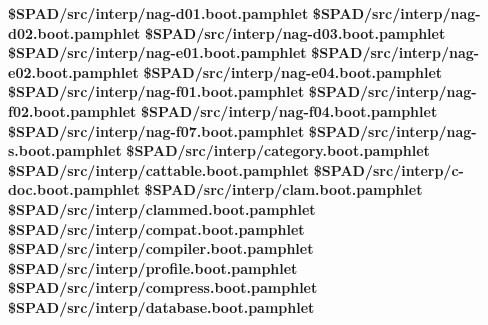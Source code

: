 \documentclass{article}
\begin{document}
\begin{thebibliography}{99}
 {\bf \$SPAD/src/interp/nag-d01.boot.pamphlet}
 {\bf \$SPAD/src/interp/nag-d02.boot.pamphlet}
 {\bf \$SPAD/src/interp/nag-d03.boot.pamphlet}
 {\bf \$SPAD/src/interp/nag-e01.boot.pamphlet}
 {\bf \$SPAD/src/interp/nag-e02.boot.pamphlet}
 {\bf \$SPAD/src/interp/nag-e04.boot.pamphlet}
 {\bf \$SPAD/src/interp/nag-f01.boot.pamphlet}
 {\bf \$SPAD/src/interp/nag-f02.boot.pamphlet}
 {\bf \$SPAD/src/interp/nag-f04.boot.pamphlet}
 {\bf \$SPAD/src/interp/nag-f07.boot.pamphlet}
 {\bf \$SPAD/src/interp/nag-s.boot.pamphlet}
 {\bf \$SPAD/src/interp/category.boot.pamphlet}
 {\bf \$SPAD/src/interp/cattable.boot.pamphlet}
 {\bf \$SPAD/src/interp/c-doc.boot.pamphlet}
 {\bf \$SPAD/src/interp/clam.boot.pamphlet}
 {\bf \$SPAD/src/interp/clammed.boot.pamphlet}
 {\bf \$SPAD/src/interp/compat.boot.pamphlet}
 {\bf \$SPAD/src/interp/compiler.boot.pamphlet}
 {\bf \$SPAD/src/interp/profile.boot.pamphlet}
 {\bf \$SPAD/src/interp/compress.boot.pamphlet}
 {\bf \$SPAD/src/interp/database.boot.pamphlet}
\end{thebibliography}
\end{document}
